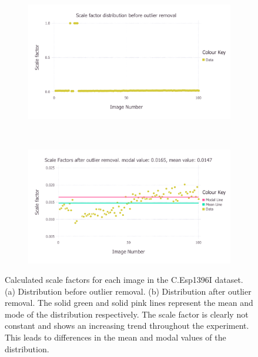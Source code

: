 \begin{figure}
    \centering
    \begin{subfigure}[b]{1.0\textwidth}
            \centering
            \includegraphics[width=\textwidth]{figures/datared/ScaleFac_Plot_Before_outlier_removal_cprot.pdf}
            \caption{}
            \label{fig:Scale factors per image before outlier removal - C.Esp1396I}
    \end{subfigure}
    \\
    \begin{subfigure}[b]{1.0\textwidth}
            \centering
            \includegraphics[width=\textwidth]{figures/datared/ScaleFac_Plot_After_outlier_removal_cprot.pdf}
            \caption{}
            \label{fig:Scale factors per image after outlier removal - C.Esp1396I}
    \end{subfigure}
    \caption[Calculated scale factors for each image in the C.Esp1396I dataset.]{Calculated scale factors for each image in the C.Esp1396I dataset.
    (a) Distribution before outlier removal.
    (b) Distribution after outlier removal.
    The solid green and solid pink lines represent the mean and mode of the distribution respectively.
    The scale factor is clearly not constant and shows an increasing trend throughout the experiment.
    This leads to differences in the mean and modal values of the distribution.}
    \label{fig:Scale factors per image - C.Esp1396I}
\end{figure}

